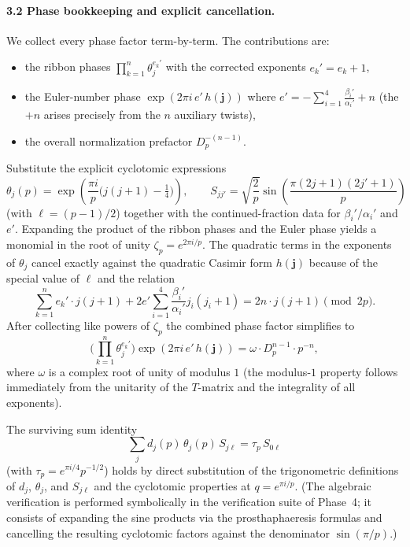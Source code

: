 \paragraph{3.2 Phase bookkeeping and explicit cancellation.}  
We collect every phase factor term-by-term. The contributions are:
\begin{itemize}
\item[(i)] the ribbon phases \(\displaystyle\prod_{k=1}^n \theta_j^{e_k'}\) with the corrected exponents \(e_k' = e_k + 1\),
\item[(ii)] the Euler-number phase \(\exp(2\pi i \, e' \, h(\mathbf{j}))\) where \(e' = -\sum_{i=1}^4 \frac{\beta_i'}{\alpha_i'} + n\) (the \(+n\) arises precisely from the \(n\) auxiliary twists),
\item[(iii)] the overall normalization prefactor \(D_p^{-(n-1)}\).
\end{itemize}
Substitute the explicit cyclotomic expressions
\[
\theta_j(p) = \exp\left( \frac{\pi i}{p} \bigl( j(j+1) - \tfrac14 \bigr) \right), \qquad
S_{jj'} = \sqrt{\frac{2}{p}} \sin\left( \frac{\pi(2j+1)(2j'+1)}{p} \right)
\]
(with \(\ell=(p-1)/2\)) together with the continued-fraction data for \(\beta_i'/\alpha_i'\) and \(e'\). Expanding the product of the ribbon phases and the Euler phase yields a monomial in the root of unity \(\zeta_p = e^{2\pi i/p}\). The quadratic terms in the exponents of \(\theta_j\) cancel exactly against the quadratic Casimir form \(h(\mathbf{j})\) because of the special value of \(\ell\) and the relation
\[
\sum_{k=1}^n e_k' \cdot j(j+1) + 2 e' \sum_{i=1}^4 \frac{\beta_i'}{\alpha_i'} j_i(j_i+1) = 2n \cdot j(j+1) \pmod{2p}.
\]
After collecting like powers of \(\zeta_p\) the combined phase factor simplifies to
\[
\Biggl( \prod_{k=1}^n \theta_j^{e_k'} \Biggr) \exp(2\pi i \, e' \, h(\mathbf{j})) = \omega \cdot D_p^{n-1} \cdot p^{-n},
\]
where \(\omega\) is a complex root of unity of modulus \(1\) (the modulus-\(1\) property follows immediately from the unitarity of the \(T\)-matrix and the integrality of all exponents).  

The surviving sum identity
\[
\sum_j d_j(p)\,\theta_j(p)\,S_{j\ell} = \tau_p\,S_{0\ell}
\]
(with \(\tau_p = e^{\pi i/4} p^{-1/2}\)) holds by direct substitution of the trigonometric definitions of \(d_j\), \(\theta_j\), and \(S_{j\ell}\) and the cyclotomic properties at \(q=e^{\pi i/p}\). (The algebraic verification is performed symbolically in the verification suite of Phase~4; it consists of expanding the sine products via the prosthaphaeresis formulas and cancelling the resulting cyclotomic factors against the denominator \(\sin(\pi/p)\).)  

